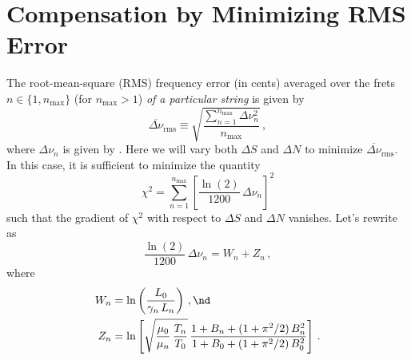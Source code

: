 %
%
%

 \section{Compensation by Minimizing RMS Error\label{app:rms}}

The root-mean-square (RMS) frequency error (in cents) averaged over the frets $n \in \{1, n_\text{max}\}$ (for $n_\text{max} > 1$) \emph{of a particular string} is given by
\begin{equation}\label{eqn:rms_def}
  \overline{\Delta \nu}_\text{rms} \equiv \sqrt{\frac{\sum_{n = 1}^{n_\text{max}} \Delta \nu_n^2}{n_\text{max}}}\, ,
\end{equation}
where $\Delta \nu_n$ is given by . Here we will vary both $\Delta S$ and $\Delta N$ to minimize $\overline{\Delta \nu}_\text{rms}$. In this case, it is sufficient to minimize the quantity
 \begin{equation}\label{eqn:chi2_def}
\chi^2 = \sum_{n = 1}^{n_\text{max}} \left[\frac{\ln(2)}{1200}\, \Delta \nu_n\right]^2
 \end{equation}
such that the gradient of $\chi^2$ with respect to $\Delta S$ and $\Delta N$ vanishes. Let's rewrite  as
\begin{equation}\label{eqn:rms_dnuwz}
  \frac{\ln(2)}{1200}\, \Delta \nu_n = W_n + Z_n\, ,
\end{equation}
where
\begin{subequations}
  \begin{align}
    W_n &= \ln \left( \frac{L_0}{\gamma_n\, L_n} \right)\, , \nd \\
    Z_n &= \ln \left[ \sqrt{\frac{\mu_0}{\mu_n}\, \frac{T_n}{T_0}}\, \frac{1 + B_n + (1 + \pi^2/2)\, B_n^2}{1 + B_0 + (1 + \pi^2/2)\, B_0^2} \right]\, .
  \end{align}
\end{subequations}


